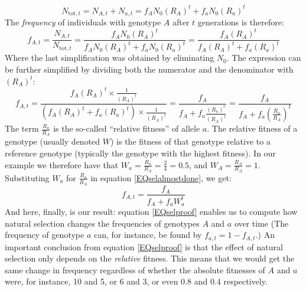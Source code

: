\documentclass[11pt,a4paper]{book}
\newcommand{\e}{\emph}
\begin{document}
\begin{equation*}
N_{\text{tot},t} = N_{A,t} + N_{a,t} = f_A N_0 (R_A)^t + f_a N_0 (R_a)^t
\end{equation*}
The \e{frequency} of individuals with genotype $A$ after $t$ generations is therefore:
%
\begin{equation*}
\label{EQseltmpres}
f_{A,t} = \frac{N_{A,t}}{N_{\text{tot},t}} =\frac{f_A N_0 (R_A)^t}{f_A N_0 (R_A)^t + f_a N_0 (R_a)^t} =\frac{f_A (R_A)^t}{f_A (R_A)^t + f_a (R_a)^t} 
\end{equation*}
%
Where the last simplification was obtained by eliminating $N_0$. The expression can be further simplified by dividing both the numerator and the denominator with $(R_A)^t$:
%
\begin{equation}
\label{EQselalmostdone}
f_{A,t} = \frac{f_A (R_A)^t\times \frac{1}{(R_A)^t}}{(f_A (R_A)^t + f_a (R_a)^t)\times \frac{1}{(R_A)^t}}  = \frac{f_A}{f_A+f_a\frac{(R_a)^t}{(R_A)^t}} =  \frac{f_A}{f_A+f_a(\frac{R_a}{R_A})^t}
\end{equation}
%
The term $\frac{R_a}{R_A}$ is the so-called ``relative fitness'' of allele $a$. The relative fitness of a genotype (usually denoted $W$) is the fitness of that genotype relative to a reference genotype (typically the genotype with the highest fitness). In our example we therefore have that $W_a = \frac{R_a}{R_A} = \frac{2}{4} = 0.5$, and $W_A = \frac{R_A}{R_A} = 1$. Substituting $W_a$ for $\frac{R_a}{R_A}$ in equation \ref{EQselalmostdone}, we get:
%
\begin{equation}
\label{EQselproof}
f_{A,t} = \frac{f_A}{f_A + f_a W_a^t}
\end{equation}
%
And here, finally, is our result: equation \ref{EQselproof} enables us to compute how natural selection changes the frequencies of genotypes $A$ and $a$ over time (The frequency of genotype $a$ can, for instance, be found by $f_{a,t} = 1-f_{A,t}$.) An important conclusion from equation \ref{EQselproof} is that the effect of natural selection only depends on the \e{relative} fitness. This means that we would get the same change in frequency regardless of whether the absolute fitnesses of $A$ and $a$ were, for instance, 10 and 5, or 6 and 3, or even 0.8 and 0.4 respectively. 
\end{document}
